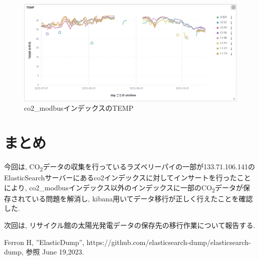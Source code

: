 \documentclass[a4j,12pt,]{jarticle}
\begin{document}
\begin{figure}[H]
  \begin{center}
    \includegraphics[width=160mm]{co2ModbusTemp.png}
    \caption{co2\_modbusインデックスのTEMP}
    \label{p7}
  \end{center}
\end{figure}

\section{まとめ}
今回は, CO\textsubscript{2}データの収集を行っているラズベリーパイの一部が133.71.106.141のElasticSearchサーバーにあるco2インデックスに対してインサートを行ったことにより, co2\_modbusインデックス以外のインデックスに一部のCO\textsubscript{2}データが保存されている問題を解消し, kibana用いてデータ移行が正しく行えたことを確認した.

次回は, リサイクル館の太陽光発電データの保存先の移行作業について報告する.

\begin{thebibliography}{5}
  Ferron H, ”ElasticDump”, https://github.com/elasticsearch-dump/elasticsearch-dump, 参照 June 19,2023.
\end{thebibliography}
\end{document}
